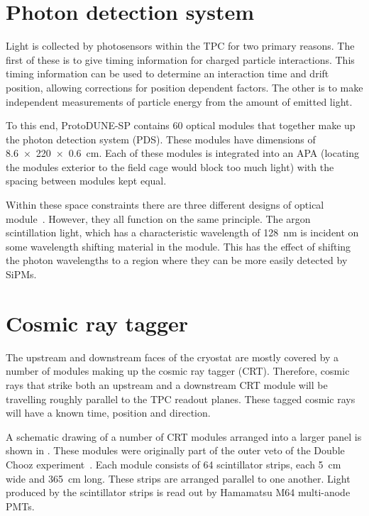 \section{Photon detection system}
\label{sec:protodune:pds}

Light is collected by photosensors within the TPC for two primary reasons. 
The first of these is to give timing information for charged particle interactions.
This timing information can be used to determine an interaction time and drift position, allowing corrections for position dependent factors.
The other is to make independent measurements of particle energy from the amount of emitted light.

To this end, ProtoDUNE-SP contains 60 optical modules that together make up the photon detection system (PDS).
These modules have dimensions of \SI{8.6 x 220 x 0.6}{\cm}.
Each of these modules is integrated into an APA (locating the modules exterior to the field cage would block too much light) with the spacing between modules kept equal.

Within these space constraints there are three different designs of optical module~\cite{protoduneSP_tdr}.
However, they all function on the same principle. 
The argon scintillation light, which has a characteristic wavelength of \SI{128}{\nano\metre} is incident on some wavelength shifting material in the module.
This has the effect of shifting the photon wavelengths to a region where they can be more easily detected by SiPMs. 

\section{Cosmic ray tagger}
\label{sec:protodune:crt}

The upstream and downstream faces of the cryostat are mostly covered by a number of modules making up the cosmic ray tagger (CRT).
Therefore, cosmic rays that strike both an upstream and a downstream CRT module will be travelling roughly parallel to the TPC readout planes.
These tagged cosmic rays will have a known time, position and direction.

A schematic drawing of a number of CRT modules arranged into a larger panel is shown in .
These modules were originally part of the outer veto of the Double Chooz experiment~\cite{dcIV}.
Each module consists of 64 scintillator strips, each \SI{5}{\cm} wide and \SI{365}{\cm} long.
These strips are arranged parallel to one another.
Light produced by the scintillator strips is read out by Hamamatsu M64 multi-anode PMTs.

